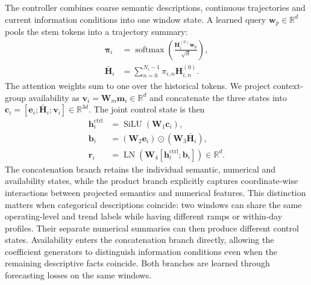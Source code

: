 \documentclass[journal]{IEEEtran}
\begin{document}
The controller combines coarse semantic descriptions, continuous trajectories and current information conditions into one window state. A learned query $\mathbf w_p\in\mathbb R^d$ pools the stem tokens into a trajectory summary:
\begin{equation}
\label{eq:joint-state-input}
\begin{aligned}
\boldsymbol\pi_i&=\operatorname{softmax}
\!\left(\frac{\mathbf H_i^{(0)}\mathbf w_p}{\sqrt d}\right),\\
\bar{\mathbf H}_i&=\sum_{n=0}^{N_i-1}\pi_{i,n}\mathbf H_{i,n}^{(0)}.
\end{aligned}
\end{equation}
The attention weights sum to one over the historical tokens. We project context-group availability as $\mathbf v_i=\mathbf W_m\mathbf m_i\in\mathbb R^d$ and concatenate the three states into $\mathbf c_i=[\mathbf e_i;\bar{\mathbf H}_i;\mathbf v_i]\in\mathbb R^{3d}$. The joint control state is then
\begin{equation}
\label{eq:window-residual-code}
\begin{aligned}
\mathbf h_i^{\mathrm{ctrl}}&=\operatorname{SiLU}(\mathbf W_1\mathbf c_i),\\
\mathbf b_i&=(\mathbf W_2\mathbf e_i)\odot(\mathbf W_3\bar{\mathbf H}_i),\\
\mathbf r_i&=\operatorname{LN}(\mathbf W_4[\mathbf h_i^{\mathrm{ctrl}};\mathbf b_i])
\in\mathbb R^{d}.
\end{aligned}
\end{equation}
The concatenation branch retains the individual semantic, numerical and availability states, while the product branch explicitly captures coordinate-wise interactions between projected semantics and numerical features. This distinction matters when categorical descriptions coincide: two windows can share the same operating-level and trend labels while having different ramps or within-day profiles. Their separate numerical summaries can then produce different control states. Availability enters the concatenation branch directly, allowing the coefficient generators to distinguish information conditions even when the remaining descriptive facts coincide. Both branches are learned through forecasting losses on the same windows.
\end{document}
